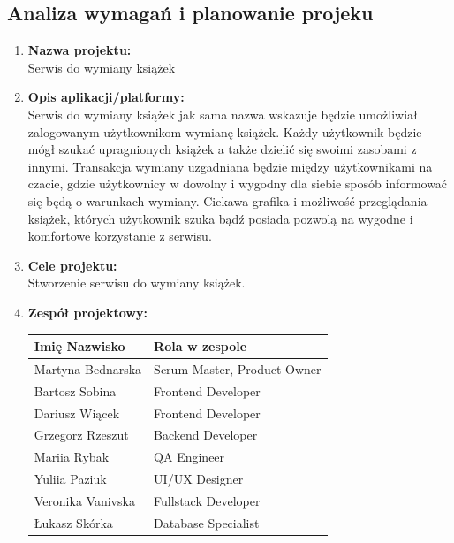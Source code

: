 \documentclass[12pt]{article}
\begin{document}
\subsection{Analiza wymagań i planowanie projeku}
\begin{enumerate}[label=\large\alph*.]
	\item \textbf{\large Nazwa projektu:}
	\\Serwis do wymiany książek
	\item \textbf{\large Opis aplikacji/platformy:}
	\\Serwis do wymiany książek jak sama nazwa wskazuje będzie umożliwiał zalogowanym użytkownikom wymianę książek. Każdy użytkownik będzie mógł szukać upragnionych książek a także dzielić się swoimi zasobami z innymi. Transakcja wymiany uzgadniana będzie między użytkownikami na czacie, gdzie użytkownicy w dowolny i wygodny dla siebie sposób informować się będą o warunkach wymiany. Ciekawa grafika i możliwość przeglądania książek, których użytkownik szuka bądź posiada pozwolą na wygodne i komfortowe korzystanie z serwisu.
	\item \textbf{\large Cele projektu:}
	\\Stworzenie serwisu do wymiany książek.
	\item \textbf{\large Zespół projektowy:}\vspace{10pt}
	\\
	\begin{tabular}{|l|l|}
		\hline
		\textbf{Imię Nazwisko} & \textbf{Rola w zespole}\\\hline
		Martyna Bednarska & Scrum Master, Product Owner\\\hline
		Bartosz Sobina & Frontend Developer\\\hline
		Dariusz Wiącek & Frontend Developer\\\hline
		Grzegorz Rzeszut & Backend Developer\\\hline
		Mariia Rybak & QA Engineer\\\hline
		Yuliia Paziuk & UI/UX Designer\\\hline
		Veronika Vanivska & Fullstack Developer\\\hline
		Łukasz Skórka & Database Specialist\\\hline
	\end{tabular}
\end{enumerate}
\end{document}
